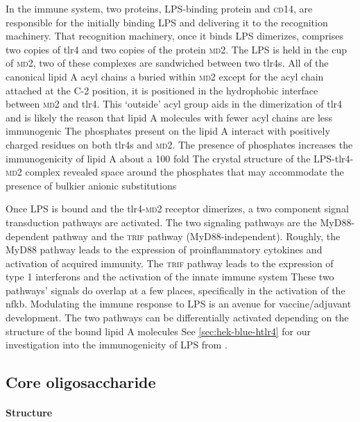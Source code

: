 In the immune system, two proteins, \ac{LPS}-binding protein and \textsc{cd}14, are responsible for the initially binding \ac{LPS} and delivering it to the recognition machinery.
That recognition machinery, once it binds \ac{LPS} dimerizes, comprises two copies of \ac{tlr4} and two copies of the protein \textsc{md}2. The \ac{LPS} is held in the cup of
\textsc{md}2, two of these complexes are sandwiched between two \acp{tlr4}. All of the canonical lipid A acyl chains a buried within \textsc{md}2 except for the acyl chain attached
at the C-2 position, it is positioned in the hydrophobic interface between \textsc{md}2 and \ac{tlr4}. This `outside' acyl group aids in the dimerization of \ac{tlr4} and is likely
the reason that lipid A molecules with fewer acyl chains are less immunogenic The phosphates present on the lipid A interact with positively
charged residues on both \acp{tlr4} and \textsc{md}2. The presence of phosphates increases the immunogenicity of lipid A about a 100 fold The
crystal structure of the \ac{LPS}-\ac{tlr4}-\textsc{md}2 complex revealed space around the phosphates that may accommodate the presence of bulkier anionic
substitutions

Once \ac{LPS} is bound and the \ac{tlr4}-\textsc{md}2 receptor dimerizes, a two component signal transduction pathways are activated. The two signaling pathways are the
MyD88-dependent pathway and the \textsc{trif} pathway (MyD88-independent).
Roughly, the MyD88 pathway leads to the expression of proinflammatory cytokines
and activation of acquired immunity. The \textsc{trif}
pathway leads to the expression of type 1 interferons and the activation of the innate immune system These two pathways' signals do overlap at a few places,
specifically in the activation of the \ac{nfkb}. Modulating the immune response to \ac{LPS} is an avenue for vaccine/adjuvant development. The two pathways can be differentially
activated depending on the structure of the bound lipid A molecules See \cref{sec:hek-blue-htlr4} for our investigation into the immunogenicity of
\ac{LPS} from \caulobacter.

  \subsection{Core oligosaccharide}\label{sec:core-oligosaccharide-intro}
  
    \paragraph{Structure}

